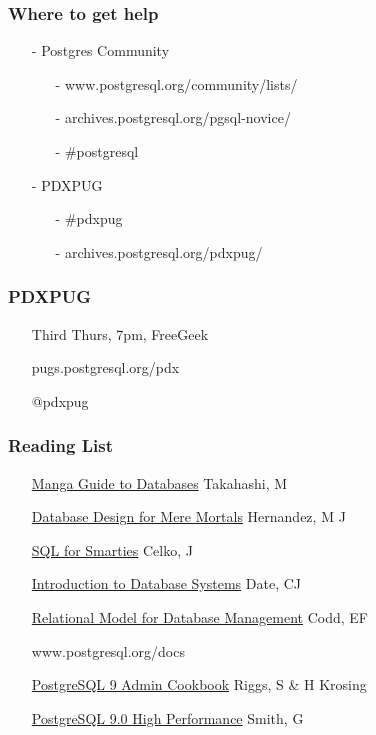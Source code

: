 \documentclass[20pt]{beamer}
\begin{document}
\frame
{
    \frametitle{Where to get help}
    \begin{itemize}
    \item[-] Postgres Community
        \begin{itemize}
        \item[-] www.postgresql.org/community/lists/
        \item[-] archives.postgresql.org/pgsql-novice/
        \item[-] \#postgresql
        \end{itemize}
    \item[-] PDXPUG
        \begin{itemize}
            \item[-] \#pdxpug
            \item[-] archives.postgresql.org/pdxpug/
        \end{itemize}
    \end{itemize}
}

\frame
{
    \frametitle{PDXPUG}
    \begin{itemize}
    \item[] Third Thurs, 7pm, FreeGeek
    \item[] pugs.postgresql.org/pdx
    \item[] @pdxpug
    \end{itemize}
}

\frame
{
    \frametitle{Reading List}
    \begin{itemize}
    \item[] \underline{Manga Guide to Databases} Takahashi, M
    \item[] \underline{Database Design for Mere Mortals} Hernandez, M J
    \item[] \underline{SQL for Smarties} Celko, J
    \item[] \underline{Introduction to Database Systems} Date, CJ
    \item[] \underline{Relational Model for Database Management} Codd, EF
    \item[] www.postgresql.org/docs
    \item[] \underline{PostgreSQL 9 Admin Cookbook} Riggs, S \& H Krosing
    \item[] \underline{PostgreSQL 9.0 High Performance} Smith, G
    \end{itemize}
}

\end{document}
